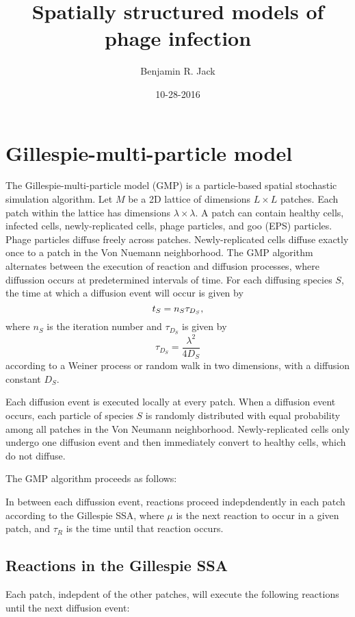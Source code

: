 \documentclass{article}
\title{Spatially structured models of phage infection}
\date{10-28-2016}
\author{Benjamin R. Jack}
\begin{document}
\maketitle

\section{Gillespie-multi-particle model}
The Gillespie-multi-particle model (GMP) is a particle-based spatial stochastic simulation algorithm. Let $M$ be a 2D lattice of dimensions $L \times L$ patches. Each patch within the lattice has dimensions $\lambda \times \lambda$. A patch can contain healthy cells, infected cells, newly-replicated cells, phage particles, and goo (EPS) particles. Phage particles diffuse freely across patches. Newly-replicated cells diffuse exactly once to a patch in the Von Nuemann neighborhood. The GMP algorithm alternates between the execution of reaction and diffusion processes, where diffussion occurs at predetermined intervals of time. For each diffusing species $S$, the time at which a diffusion event will occur is given by
\begin{equation}
t_{S} = n_{S}\tau_{D_S} \\,
\end{equation}
where $n_S$ is the iteration number and $\tau_{D_S}$ is given by
\begin{equation}
\tau_{D_S} = \frac{\lambda^{2}}{4D_S}
\end{equation}
according to a Weiner process or random walk in two dimensions, with a diffusion constant $D_S$.

Each diffusion event is executed locally at every patch. When a diffusion event occurs, each particle of species $S$ is randomly distributed with equal probability among all patches in the Von Neumann neighborhood. Newly-replicated cells only undergo one diffusion event and then immediately convert to healthy cells, which do not diffuse.

The GMP algorithm proceeds as follows:

In between each diffussion event, reactions proceed indepdendently in each patch according to the Gillespie SSA, where $\mu$ is the next reaction to occur in a given patch, and $\tau_R$ is the time until that reaction occurs.

\subsection{Reactions in the Gillespie SSA}
Each patch, indepdent of the other patches, will execute the following reactions until the next diffusion event:
\end{document}

